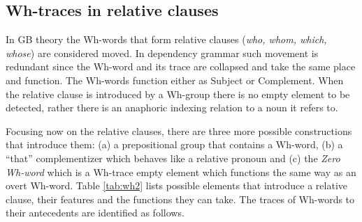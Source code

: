 \subsection{Wh-traces in relative clauses}
\label{sec:wh-traces-relative}
    In GB theory the Wh-words that form relative clauses (\textit{who, whom, which, whose}) are considered moved. In dependency grammar such movement is redundant since the Wh-word and its trace are collapsed and take the same place and function. The Wh-words function either as Subject or Complement. When the relative clause is introduced by a Wh-group there is no empty element to be detected, rather there is an anaphoric indexing relation to a noun it refers to. 

    \begin{table}[!ht]
    	\caption{The Wh-words introducing a relative clause.}
    	\label{tab:wh2}
    \end{table}

    Focusing now on the relative clauses, there are three more possible constructions that introduce them: (a) a prepositional group that contains a Wh-word, (b) a ``that'' complementizer which behaves like a relative pronoun and (c) the \textit{Zero Wh-word} which is a Wh-trace empty element which functions the same way as an overt Wh-word. Table \ref{tab:wh2} lists possible elements that introduce a relative clause, their features and the functions they can take. The traces of Wh-words to their antecedents are identified as follows. 

